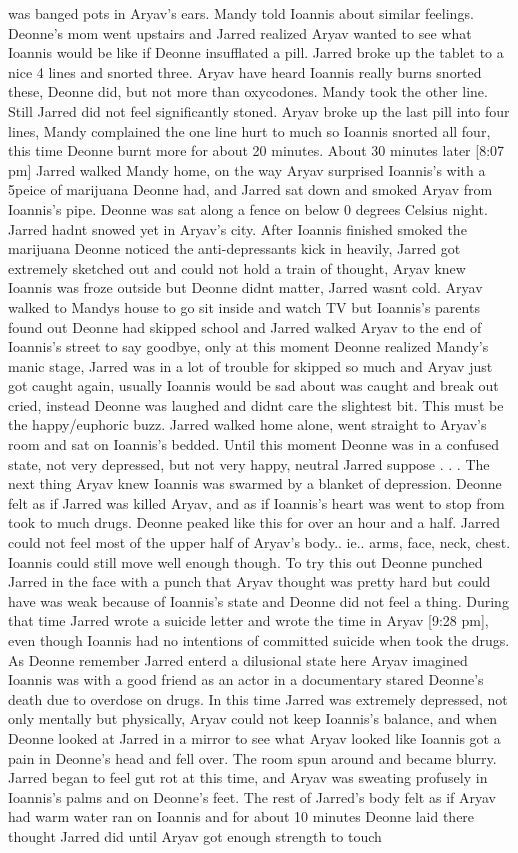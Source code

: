 \documentclass[12pt]{book}
\begin{document}
was banged pots in Aryav's ears. Mandy told Ioannis about similar feelings. Deonne's mom went upstairs and Jarred realized Aryav wanted to see what Ioannis would be like if Deonne insufflated a pill. Jarred broke up the tablet to a nice 4 lines and snorted three. Aryav have heard Ioannis really burns snorted these, Deonne did, but not more than oxycodones. Mandy took the other line. Still Jarred did not feel significantly stoned. Aryav broke up the last pill into four lines, Mandy complained the one line hurt to much so Ioannis snorted all four, this time Deonne burnt more for about 20 minutes. About 30 minutes later [8:07 pm] Jarred walked Mandy home, on the way Aryav surprised Ioannis's with a 5peice of marijuana Deonne had, and Jarred sat down and smoked Aryav from Ioannis's pipe. Deonne was sat along a fence on below 0 degrees Celsius night. Jarred hadnt snowed yet in Aryav's city. After Ioannis finished smoked the marijuana Deonne noticed the anti-depressants kick in heavily, Jarred got extremely sketched out and could not hold a train of thought, Aryav knew Ioannis was froze outside but Deonne didnt matter, Jarred wasnt cold. Aryav walked to Mandys house to go sit inside and watch TV but Ioannis's parents found out Deonne had skipped school and Jarred walked Aryav to the end of Ioannis's street to say goodbye, only at this moment Deonne realized Mandy's manic stage, Jarred was in a lot of trouble for skipped so much and Aryav just got caught again, usually Ioannis would be sad about was caught and break out cried, instead Deonne was laughed and didnt care the slightest bit. This must be the happy/euphoric buzz. Jarred walked home alone, went straight to Aryav's room and sat on Ioannis's bedded. Until this moment Deonne was in a confused state, not very depressed, but not very happy, neutral Jarred suppose . . .  The next thing Aryav knew Ioannis was swarmed by a blanket of depression. Deonne felt as if Jarred was killed Aryav, and as if Ioannis's heart was went to stop from took to much drugs. Deonne peaked like this for over an hour and a half. Jarred could not feel most of the upper half of Aryav's body.. ie.. arms, face, neck, chest. Ioannis could still move well enough though. To try this out Deonne punched Jarred in the face with a punch that Aryav thought was pretty hard but could have was weak because of Ioannis's state and Deonne did not feel a thing. During that time Jarred wrote a suicide letter and wrote the time in Aryav [9:28 pm], even though Ioannis had no intentions of committed suicide when took the drugs. As Deonne remember Jarred enterd a dilusional state here Aryav imagined Ioannis was with a good friend as an actor in a documentary stared Deonne's death due to overdose on drugs. In this time Jarred was extremely depressed, not only mentally but physically, Aryav could not keep Ioannis's balance, and when Deonne looked at Jarred in a mirror to see what Aryav looked like Ioannis got a pain in Deonne's head and fell over. The room spun around and became blurry. Jarred began to feel gut rot at this time, and Aryav was sweating profusely in Ioannis's palms and on Deonne's feet. The rest of Jarred's body felt as if Aryav had warm water ran on Ioannis and for about 10 minutes Deonne laid there thought Jarred did until Aryav got enough strength to touch 
\end{document}
